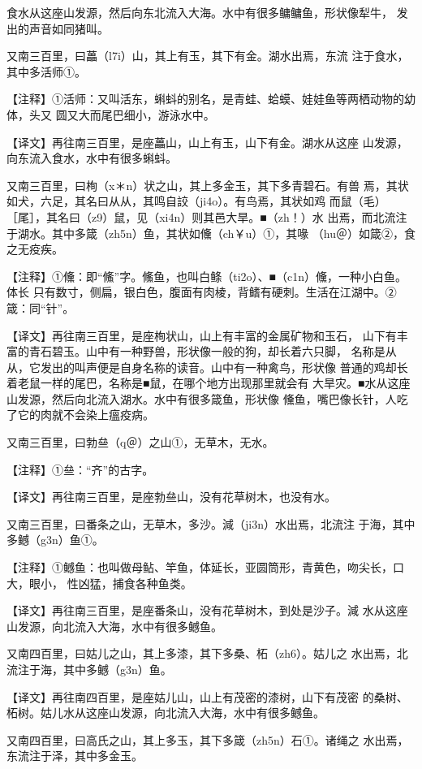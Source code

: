 \documentclass[a4paper,12pt,UTF8,twoside]{ctexbook}
\begin{document}
食水从这座山发源，然后向东北流入大海。水中有很多鳙鳙鱼，形状像犁牛， 发出的声音如同猪叫。

又南三百里，曰藟（l7i）山，其上有玉，其下有金。湖水出焉，东流 注于食水，其中多活师①。

【注释】①活师：又叫活东，蝌蚪的别名，是青蛙、蛤蟆、娃娃鱼等两栖动物的幼体，头又 圆又大而尾巴细小，游泳水中。

【译文】再往南三百里，是座藟山，山上有玉，山下有金。湖水从这座 山发源，向东流入食水，水中有很多蝌蚪。

又南三百里，曰栒（x＊n）状之山，其上多金玉，其下多青碧石。有兽 焉，其状如犬，六足，其名曰从从，其鸣自詨（ji4o）。有鸟焉，其状如鸡 而鼠（毛）［尾］，其名曰（z9）鼠，见（xi4n）则其邑大旱。■（zh！）水 出焉，而北流注于湖水。其中多箴（zh5n）鱼，其状如儵（ch￥u）①，其喙 （hu＠）如箴②，食之无疫疾。

【注释】①儵：即“鯈”字。鯈鱼，也叫白鲦（ti2o）、■（c1n）儵，一种小白鱼。体长 只有数寸，侧扁，银白色，腹面有肉棱，背鳍有硬刺。生活在江湖中。②箴：同“针”。

【译文】再往南三百里，是座栒状山，山上有丰富的金属矿物和玉石， 山下有丰富的青石碧玉。山中有一种野兽，形状像一般的狗，却长着六只脚， 名称是从从，它发出的叫声便是自身名称的读音。山中有一种禽鸟，形状像 普通的鸡却长着老鼠一样的尾巴，名称是■鼠，在哪个地方出现那里就会有 大旱灾。■水从这座山发源，然后向北流入湖水。水中有很多箴鱼，形状像 儵鱼，嘴巴像长针，人吃了它的肉就不会染上瘟疫病。

又南三百里，曰勃亝（q＠）之山①，无草木，无水。

【注释】①亝：“齐”的古字。

【译文】再往南三百里，是座勃亝山，没有花草树木，也没有水。

又南三百里，曰番条之山，无草木，多沙。減（ji3n）水出焉，北流注 于海，其中多鳡（g3n）鱼①。

【注释】①鳡鱼：也叫做母鲇、竿鱼，体延长，亚圆筒形，青黄色，吻尖长，口大，眼小， 性凶猛，捕食各种鱼类。

【译文】再往南三百里，是座番条山，没有花草树木，到处是沙子。減 水从这座山发源，向北流入大海，水中有很多鳡鱼。

又南四百里，曰姑儿之山，其上多漆，其下多桑、柘（zh6）。姑儿之 水出焉，北流注于海，其中多鳡（g3n）鱼。

【译文】再往南四百里，是座姑儿山，山上有茂密的漆树，山下有茂密 的桑树、柘树。姑儿水从这座山发源，向北流入大海，水中有很多鳡鱼。

又南四百里，曰高氏之山，其上多玉，其下多箴（zh5n）石①。诸绳之 水出焉，东流注于泽，其中多金玉。
\end{document}
